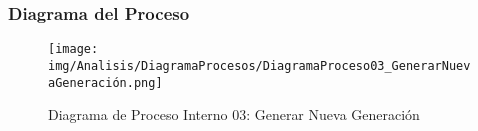 \subsubsection{Diagrama del Proceso}
\begin{figure}[H]
    \centering
    \texttt{[image: img/Analisis/DiagramaProcesos/DiagramaProceso03\_GenerarNuevaGeneración.png]}
    \caption{Diagrama de Proceso Interno 03: Generar Nueva Generación}%
    \label{fig:process_diagram03}
\end{figure}